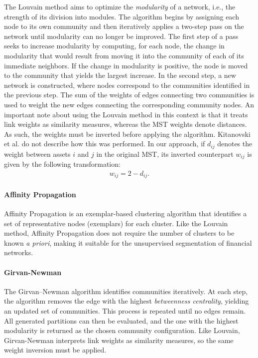 \documentclass[acmsmall,screen,nonacm]{acmart}
\begin{document}
The Louvain method aims to optimize the \emph{modularity} of a network, i.e., the strength of its division into modules.
The algorithm begins by assigning each node to its own community and then iteratively applies a two-step pass on the network until modularity can no longer be improved.
The first step of a pass seeks to increase modularity by computing, for each node, the change in modularity that would result from moving it into the community of each of its immediate neighbors.
If the change in modularity is positive, the node is moved to the community that yields the largest increase.
In the second step, a new network is constructed, where nodes correspond to the communities identified in the previous step.
The sum of the weights of edges connecting two communities is used to weight the new edges connecting the corresponding community nodes.
An important note about using the Louvain method in this context is that it treats link weights as similarity measures, whereas the MST weights denote distances.
As such, the weights must be inverted before applying the algorithm.
Kitanovski et al. do not describe how this was performed.
In our approach, if $d_{ij}$ denotes the weight between assets $i$ and $j$ in the original MST, its inverted counterpart $w_{ij}$ is given by the following transformation:
\begin{align}
    w_{ij} = 2 - d_{ij}.
\end{align}

\paragraph{Affinity Propagation}

Affinity Propagation is an exemplar-based clustering algorithm that identifies a set of representative nodes (exemplars) for each cluster.
Like the Louvain method, Affinity Propagation does not require the number of clusters to be known \emph{a priori}, making it suitable for the unsupervised segmentation of financial networks.

\paragraph{Girvan-Newman}

The Girvan–Newman algorithm identifies communities iteratively.
At each step, the algorithm removes the edge with the highest \emph{betweenness centrality}, yielding an updated set of communities.
This process is repeated until no edges remain.
All generated partitions can then be evaluated, and the one with the highest modularity is returned as the chosen community configuration.
Like Louvain, Girvan-Newman interprets link weights as similarity measures, so the same weight inversion must be applied.
\end{document}
